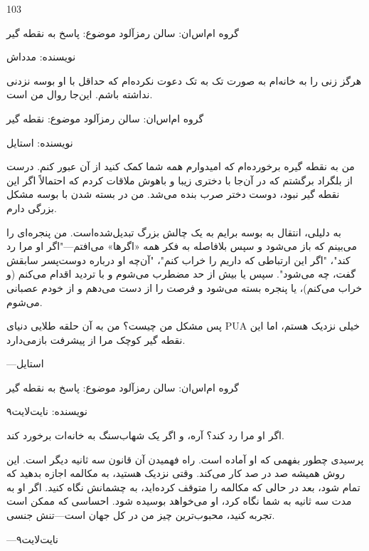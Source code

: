 103

گروه ام‌اس‌ان: سالن رمزآلود
موضوع: پاسخ به نقطه گیر

نویسنده: مدداش

هرگز زنی را به خانه‌ام به صورت تک به تک دعوت نکرده‌ام که حداقل با او بوسه نزدنی نداشته‌ باشم. این‌جا روال من است.

گروه ام‌اس‌ان: سالن رمزآلود
موضوع: نقطه گیر

نویسنده: استایل

من به نقطه گیره برخورده‌ام که امیدوارم همه شما کمک کنید از آن عبور کنم. درست از بلگراد برگشتم که در آن‌جا با دختری زیبا و باهوش ملاقات کردم که احتمالاً اگر این نقطه گیر نبود، دوست دختر صرب بنده می‌شد. من در بسته شدن با بوسه مشکل بزرگی دارم.

به دلیلی، انتقال به بوسه برایم به یک چالش بزرگ تبدیل‌شده‌است. من پنجره‌ای را می‌بینم که باز می‌شود و سپس بلافاصله به فکر همه «اگرها» می‌افتم—"اگر او مرا رد کند"، "اگر این ارتباطی که داریم را خراب کنم"، "آن‌چه او درباره دوست‌پسر سابقش گفت، چه می‌شود". سپس یا بیش از حد مضطرب می‌شوم و با تردید اقدام می‌کنم (و خراب می‌کنم)، یا پنجره بسته می‌شود و فرصت را از دست می‌دهم و از خودم عصبانی می‌شوم. 

پس مشکل من چیست؟ من به آن حلقه طلایی دنیای PUA خیلی نزدیک هستم، اما این نقطه گیر کوچک مرا از پیشرفت بازمی‌دارد.

—استایل

گروه ام‌اس‌ان: سالن رمزآلود
موضوع: پاسخ به نقطه گیر

نویسنده: نایت‌لایت۹

اگر او مرا رد کند؟ آره، و اگر یک شهاب‌سنگ به خانه‌ات برخورد کند.

پرسیدی چطور بفهمی که او آماده است. راه فهمیدن آن قانون سه ثانیه دیگر است. این روش همیشه صد در صد کار می‌کند. وقتی نزدیک هستید، به مکالمه اجازه بدهید که تمام شود، بعد در حالی که مکالمه را متوقف کرده‌اید، به چشمانش نگاه کنید. اگر او به مدت سه ثانیه به شما نگاه کرد، او می‌خواهد بوسیده شود. احساسی که ممکن است تجربه کنید، محبوب‌ترین چیز من در کل جهان است—تنش جنسی.

—نایت‌لایت۹